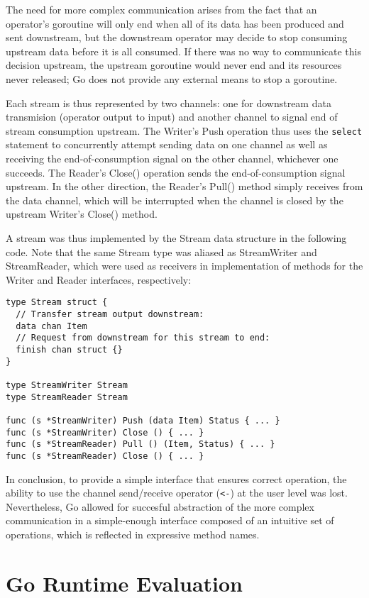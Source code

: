 \documentclass {article}
\begin{document}
The need for more complex communication arises from the fact that an operator's goroutine will only end when all of its data has been produced and sent downstream, but the downstream operator may decide to stop consuming upstream data before it is all consumed. If there was no way to communicate this decision upstream, the upstream goroutine would never end and its resources never released; Go does not provide any external means to stop a goroutine.

Each stream is thus represented by two channels: one for downstream data transmision (operator output to input) and another channel to signal end of stream consumption upstream. The Writer's Push operation thus uses the \lstinline|select| statement to concurrently attempt sending data on one channel as well as receiving the end-of-consumption signal on the other channel, whichever one succeeds. The Reader's Close() operation sends the end-of-consumption signal upstream. In the other direction, the Reader's Pull() method simply receives from the data channel, which will be interrupted when the channel is closed by the upstream Writer's Close() method.

A stream was thus implemented by the Stream data structure in the following code. Note that the same Stream type was aliased as StreamWriter and StreamReader, which were used as receivers in implementation of methods for the Writer and Reader interfaces, respectively:

\begin{lstlisting}
type Stream struct {
  // Transfer stream output downstream:
  data chan Item
  // Request from downstream for this stream to end:
  finish chan struct {}
}

type StreamWriter Stream
type StreamReader Stream

func (s *StreamWriter) Push (data Item) Status { ... }
func (s *StreamWriter) Close () { ... }
func (s *StreamReader) Pull () (Item, Status) { ... }
func (s *StreamReader) Close () { ... }
\end{lstlisting}

In conclusion, to provide a simple interface that ensures correct operation, the ability to use the channel send/receive operator (\lstinline|<-|) at the user level was lost. Nevertheless, Go allowed for succesful abstraction of the more complex communication in a simple-enough interface composed of an intuitive set of operations, which is reflected in expressive method names.



\section{Go Runtime Evaluation}
\label{sec:runtime}
\end{document}
